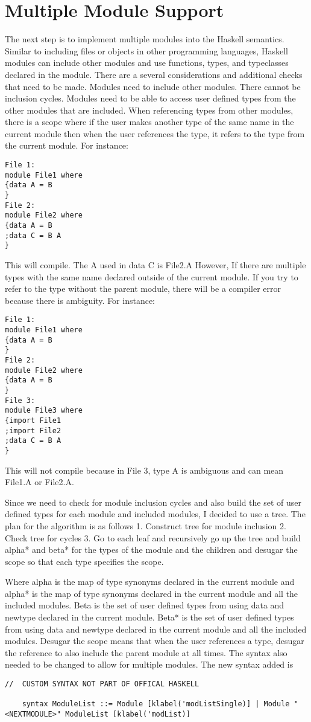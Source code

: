 \chapter{Multiple Module Support}
The next step is to implement multiple modules into the Haskell semantics. Similar to including files or objects in other programming languages, Haskell modules can include other modules and use functions, types, and typeclasses declared in the module.
There are a several considerations and additional checks that need to be made.
Modules need to include other modules.
There cannot be inclusion cycles.
Modules need to be able to access user defined types from the other modules that are included.
When referencing types from other modules, there is a scope where if the user makes another type of the same name in the current module then when the user references the type, it refers to the type from the current module.
For instance:
\begin{lstlisting}
File 1:
module File1 where
{data A = B
}
File 2:
module File2 where
{data A = B
;data C = B A
}
\end{lstlisting}
	This will compile. The A used in data C is File2.A
However, If there are multiple types with the same name declared outside of the current module. If you try to refer to the type without the parent module, there will be a compiler error because there is ambiguity.
For instance:
\begin{lstlisting}
File 1:
module File1 where
{data A = B
}
File 2:
module File2 where
{data A = B
}
File 3:
module File3 where
{import File1
;import File2
;data C = B A
}
\end{lstlisting}

	This will not compile because in File 3, type A is ambiguous and can mean File1.A or File2.A.

Since we need to check for module inclusion cycles and also build the set of user defined types for each module and included modules, I decided to use a tree.
The plan for the algorithm is as follows
1. Construct tree for module inclusion
2. Check tree for cycles
3. Go to each leaf and recursively go up the tree and build alpha* and beta* for the types of the module and the children and desugar the scope so that each type specifies the scope.

Where alpha is the map of type synonyms declared in the current module and alpha* is the map of type synonyms declared in the current module and all the included modules. Beta is the set of user defined types from using data and newtype declared in the current module. Beta* is the set of user defined types from using data and newtype declared in the current module and all the included modules. 
Desugar the scope means that when the user references a type, desugar the reference to also include the parent module at all times.
The syntax also needed to be changed to allow for multiple modules. The new syntax added is
\begin{lstlisting}
//  CUSTOM SYNTAX NOT PART OF OFFICAL HASKELL

    syntax ModuleList ::= Module [klabel('modListSingle)] | Module "<NEXTMODULE>" ModuleList [klabel('modList)]
\end{lstlisting}

